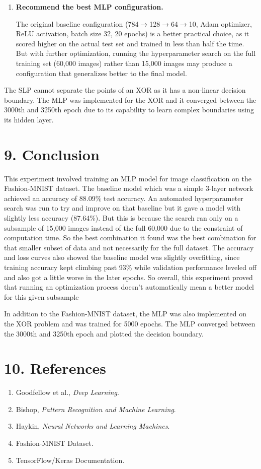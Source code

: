 \documentclass[11pt]{article}
\begin{document}
\begin{enumerate}[leftmargin=*]
\item \textbf{Recommend the best MLP configuration.}

The original baseline configuration (784$\rightarrow$128$\rightarrow$64$\rightarrow$10, Adam optimizer, ReLU activation, batch size 32, 20 epochs) is a better practical choice, as it scored higher on the actual test set and trained in less than half the time. But with further optimization, running the hyperparameter search on the full training set (60,000 images) rather than 15,000 images may produce a configuration that generalizes better to the final model.

\end{enumerate}

The SLP cannot separate the points of an XOR as it has a non-linear decision boundary. The MLP was implemented for the XOR and it converged between the 3000th and 3250th epoch due to its capability to learn complex boundaries using its hidden layer.

\section*{9. Conclusion}

This experiment involved training an MLP model for image classification on the Fashion-MNIST dataset. The baseline model which was a simple 3-layer network achieved an accuracy of 88.09\% test accuracy. An automated hyperparameter search was run to try and improve on that baseline but it gave a model with slightly less accuracy (87.64\%). But this is because the search ran only on a subsample of 15,000 images instead of the full 60,000 due to the constraint of computation time. So the best combination it found was  the best combination for that smaller subset of data and not necessarily for the full dataset. The accuracy and loss curves also showed the baseline model was slightly overfitting, since training accuracy kept climbing past 93\% while validation performance leveled off and also got a little worse in the later epochs. So overall, this experiment proved that running an optimization process doesn't automatically mean a better model for this given subsample

In addition to the Fashion-MNIST dataset, the MLP was also implemented on the XOR problem and was trained for 5000 epochs. The MLP converged between the 3000th and 3250th epoch and plotted the decision boundary.

\section*{10. References}
\begin{enumerate}
\item Goodfellow et al., \emph{Deep Learning}.
\item Bishop, \emph{Pattern Recognition and Machine Learning}.
\item Haykin, \emph{Neural Networks and Learning Machines}.
\item Fashion-MNIST Dataset.
\item TensorFlow/Keras Documentation.
\end{enumerate}
\end{document}
